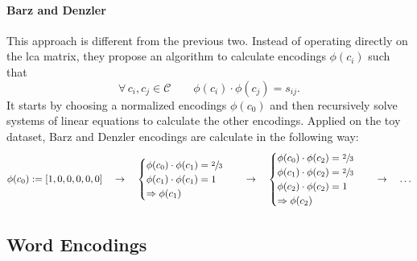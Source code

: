 \paragraph{Barz and Denzler~\cite{HierarchyBasedBarz2018}}\label{par:encoding-bd}
This approach is
different from the previous two. Instead of operating directly on the lca
matrix, they propose an algorithm to calculate encodings $\phi(c_i)$ such that
\begin{equation}
  \forall \, c_i, c_j \in \mathcal{C} \qquad
  \phi(c_i) \cdot \phi(c_j) = s_{ij}.
  \label{eq:bd-hierarchical-encoding}
\end{equation}
It starts by choosing a normalized encodings $\phi(c_0)$ and then recursively
solve systems of linear equations to calculate the other encodings.
Applied on the toy dataset, Barz and Denzler encodings are calculate in the
following way:
\begin{equation*}
  \phi{\left(c_0\right)} := \left[1, 0, 0, 0, 0, 0\right]
  \quad \rightarrow \quad
  \begin{cases}
    \phi{\left(c_0\right)} \cdot \phi{\left(c_1\right)} = \sfrac{2}{3} \\
    \phi{\left(c_1\right)} \cdot \phi{\left(c_1\right)} = 1 \\
    \Rightarrow  \phi{\left(c_1\right)}
  \end{cases}
  \quad \rightarrow \quad
  \begin{cases}
    \phi{\left(c_0\right)} \cdot \phi{\left(c_2\right)} = \sfrac{2}{3} \\
    \phi{\left(c_1\right)} \cdot \phi{\left(c_2\right)} = \sfrac{2}{3} \\
    \phi{\left(c_2\right)} \cdot \phi{\left(c_2\right)} = 1 \\
    \Rightarrow \phi{\left(c_2\right)}
  \end{cases}
  \quad \rightarrow \quad \ldots
\end{equation*}

\subsection{Word Encodings}
\label{subsec:word-encoding}

